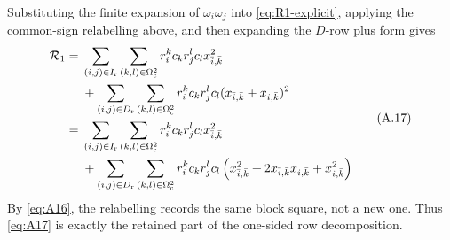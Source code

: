 \documentclass[11pt]{article}
\begin{document}
Substituting the finite expansion of $\omega_i\omega_j$ into
\eqref{eq:R1-explicit}, applying the common-sign relabelling above, and then
expanding the $D$-row plus form gives
\begin{equation}\label{eq:A17}
\begin{aligned}
\mathcal R_1
={}&\sum_{(i,j)\in I_{\rm r}}\sum_{(k,l)\in\Omega_{\rm c}^2}
 r_i^kc_k r_j^lc_l x_{\bar i,\bar k}^{2}\\
&+\sum_{(i,j)\in D_{\rm r}}\sum_{(k,l)\in\Omega_{\rm c}^2}
 r_i^kc_k r_j^lc_l
(x_{\bar i,\bar k}+x_{i,\bar k})^2\\
={}&\sum_{(i,j)\in I_{\rm r}}\sum_{(k,l)\in\Omega_{\rm c}^2}
 r_i^kc_k r_j^lc_l x_{\bar i,\bar k}^{2}\\
&+\sum_{(i,j)\in D_{\rm r}}\sum_{(k,l)\in\Omega_{\rm c}^2}
 r_i^kc_k r_j^lc_l
\left(x_{\bar i,\bar k}^{2}
+2x_{\bar i,\bar k}x_{i,\bar k}
+x_{i,\bar k}^{2}\right)
\end{aligned}
\tag{A.17}
\end{equation}
By \eqref{eq:A16}, the relabelling records the same block square, not a new
one.  Thus \eqref{eq:A17} is exactly the retained part of the one-sided row
decomposition.
\end{document}
